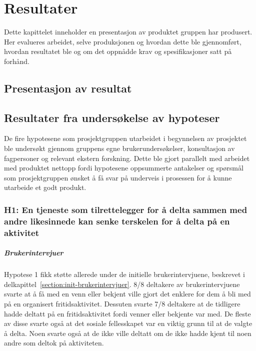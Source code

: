 \cleardoublepage
\chapter{Resultater}
\label{chap:results} 

Dette kapittelet inneholder en presentasjon av produktet gruppen har produsert. Her evalueres arbeidet, selve produksjonen og hvordan dette ble gjennomført, hvordan resultatet ble og om det oppnådde krav og spesifikasjoner satt på forhånd.

\section{Presentasjon av resultat}

\section{Resultater fra undersøkelse av hypoteser}

De fire hypotesene som prosjektgruppen utarbeidet i begynnelsen av prosjektet ble undersøkt gjennom gruppens egne brukerundersøkelser, konsultasjon av fagpersoner og relevant ekstern forskning. Dette ble gjort parallelt med arbeidet med produktet nettopp fordi hypotesene oppsummerte antakelser og spørsmål som prosjektgruppen ønsket å få svar på underveis i prosessen for å kunne utarbeide et godt produkt.

\subsection{H1: En tjeneste som tilrettelegger for å delta sammen med andre likesinnede kan senke terskelen for å delta på en aktivitet}
\paragraph{Brukerintervjuer}
Hypotese 1 fikk støtte allerede under de initielle brukerintervjuene, beskrevet i delkapittel~\ref{section:init-brukerintervjuer}. 8/8 deltakere av brukerintervjuene svarte at å få med en venn eller bekjent ville gjort det enklere for dem å bli med på en organisert fritidsaktivitet. Dessuten svarte 7/8 deltakere at de tidligere hadde deltatt på en fritidsaktivitet fordi venner eller bekjente var med. De fleste av disse svarte også at det sosiale fellesskapet var en viktig grunn til at de valgte å delta. Noen svarte også at de ikke ville deltatt om de ikke hadde kjent til noen andre som deltok på aktiviteten.

